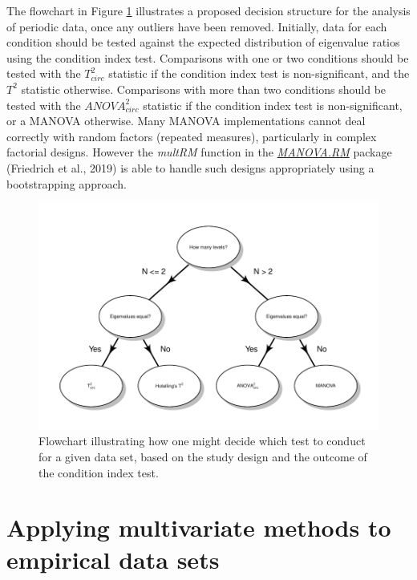 \documentclass[]{article}
\begin{document}
The flowchart in Figure \ref{fig:flowchart} illustrates a proposed decision structure for the analysis of periodic data, once any outliers have been removed. Initially, data for each condition should be tested against the expected distribution of eigenvalue ratios using the condition index test. Comparisons with one or two conditions should be tested with the \(T^2_{circ}\) statistic if the condition index test is non-significant, and the \(T^2\) statistic otherwise. Comparisons with more than two conditions should be tested with the \(ANOVA^2_{circ}\) statistic if the condition index test is non-significant, or a MANOVA otherwise. Many MANOVA implementations cannot deal correctly with random factors (repeated measures), particularly in complex factorial designs. However the \emph{multRM} function in the \href{https://CRAN.R-project.org/package=MANOVA.RM}{\emph{MANOVA.RM}} package (Friedrich et al., 2019) is able to handle such designs appropriately using a bootstrapping approach.

\begin{figure}

{\centering \includegraphics{figures/flowchart} 

}

\caption{Flowchart illustrating how one might decide which test to conduct for a given data set, based on the study design and the outcome of the condition index test.}\label{fig:flowchart}
\end{figure}

\hypertarget{applying-multivariate-methods-to-empirical-data-sets}{%
\section{Applying multivariate methods to empirical data sets}\label{applying-multivariate-methods-to-empirical-data-sets}}
\end{document}
